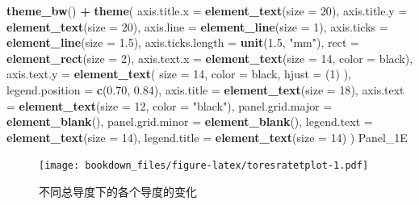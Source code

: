 \documentclass[
]{krantz}
\makeatletter
\newenvironment{Shaded}{\begin{snugshade}}{\end{snugshade}}
\newcommand{\DataTypeTok}[1]{\textcolor[rgb]{0.13,0.29,0.53}{#1}}
\newcommand{\DecValTok}[1]{\textcolor[rgb]{0.00,0.00,0.81}{#1}}
\newcommand{\FloatTok}[1]{\textcolor[rgb]{0.00,0.00,0.81}{#1}}
\newcommand{\KeywordTok}[1]{\textcolor[rgb]{0.13,0.29,0.53}{\textbf{#1}}}
\newcommand{\NormalTok}[1]{#1}
\newcommand{\OperatorTok}[1]{\textcolor[rgb]{0.81,0.36,0.00}{\textbf{#1}}}
\newcommand{\StringTok}[1]{\textcolor[rgb]{0.31,0.60,0.02}{#1}}
\newenvironment{kframe}{%
\medskip{}
\setlength{\fboxsep}{.8em}
 \def\at@end@of@kframe{}%
 \ifinner\ifhmode%
  \def\at@end@of@kframe{\end{minipage}}%
  \begin{minipage}{\columnwidth}%
 \fi\fi%
 \def\FrameCommand##1{\hskip\@totalleftmargin \hskip-\fboxsep
 \colorbox{shadecolor}{##1}\hskip-\fboxsep
     \hskip-\linewidth \hskip-\@totalleftmargin \hskip\columnwidth}%
 \MakeFramed {\advance\hsize-\width
   \@totalleftmargin\z@ \linewidth\hsize
   \@setminipage}}%
 {\par\unskip\endMakeFramed%
 \at@end@of@kframe}
\renewenvironment{Shaded}{\begin{kframe}}{\end{kframe}}
\makeatother
\begin{document}
\begin{Shaded}
\begin{Highlighting}[]
\StringTok{  }\KeywordTok{theme\_bw}\NormalTok{() }\OperatorTok{+}
\StringTok{  }\KeywordTok{theme}\NormalTok{(}
    \DataTypeTok{axis.title.x =} \KeywordTok{element\_text}\NormalTok{(}\DataTypeTok{size =} \DecValTok{20}\NormalTok{),}
    \DataTypeTok{axis.title.y =} \KeywordTok{element\_text}\NormalTok{(}\DataTypeTok{size =} \DecValTok{20}\NormalTok{),}
    \DataTypeTok{axis.line =} \KeywordTok{element\_line}\NormalTok{(}\DataTypeTok{size =} \DecValTok{1}\NormalTok{),}
    \DataTypeTok{axis.ticks =} \KeywordTok{element\_line}\NormalTok{(}\DataTypeTok{size =} \FloatTok{1.5}\NormalTok{),}
    \DataTypeTok{axis.ticks.length =} \KeywordTok{unit}\NormalTok{(}\FloatTok{1.5}\NormalTok{, }\StringTok{"mm"}\NormalTok{),}
    \DataTypeTok{rect =} \KeywordTok{element\_rect}\NormalTok{(}\DataTypeTok{size =} \DecValTok{2}\NormalTok{),}
    \DataTypeTok{axis.text.x =} \KeywordTok{element\_text}\NormalTok{(}\DataTypeTok{size =} \DecValTok{14}\NormalTok{, }\DataTypeTok{color =} \StringTok{\textquotesingle{}black\textquotesingle{}}\NormalTok{),}
    \DataTypeTok{axis.text.y =}
      \KeywordTok{element\_text}\NormalTok{(}
        \DataTypeTok{size =} \DecValTok{14}\NormalTok{,}
        \DataTypeTok{color =} \StringTok{\textquotesingle{}black\textquotesingle{}}\NormalTok{,}
        \DataTypeTok{hjust =}\NormalTok{ (}\DecValTok{1}\NormalTok{)}
\NormalTok{      ),}
    \DataTypeTok{legend.position =} \KeywordTok{c}\NormalTok{(}\FloatTok{0.70}\NormalTok{, }\FloatTok{0.84}\NormalTok{),}
    \DataTypeTok{axis.title =} \KeywordTok{element\_text}\NormalTok{(}\DataTypeTok{size =} \DecValTok{18}\NormalTok{),}
    \DataTypeTok{axis.text =} \KeywordTok{element\_text}\NormalTok{(}\DataTypeTok{size =} \DecValTok{12}\NormalTok{, }\DataTypeTok{color =} \StringTok{"black"}\NormalTok{),}
    \DataTypeTok{panel.grid.major =} \KeywordTok{element\_blank}\NormalTok{(),}
    \DataTypeTok{panel.grid.minor =} \KeywordTok{element\_blank}\NormalTok{(),}
    \DataTypeTok{legend.text =} \KeywordTok{element\_text}\NormalTok{(}\DataTypeTok{size =} \DecValTok{14}\NormalTok{),}
    \DataTypeTok{legend.title =} \KeywordTok{element\_text}\NormalTok{(}\DataTypeTok{size =} \DecValTok{14}\NormalTok{)}
\NormalTok{  )}
\NormalTok{Panel\_1E}
\end{Highlighting}
\end{Shaded}

\begin{figure}
\centering
\texttt{[image: bookdown\_files/figure-latex/toresratetplot-1.pdf]}
\caption{\label{fig:toresratetplot}不同总导度下的各个导度的变化}
\end{figure}
\end{document}
